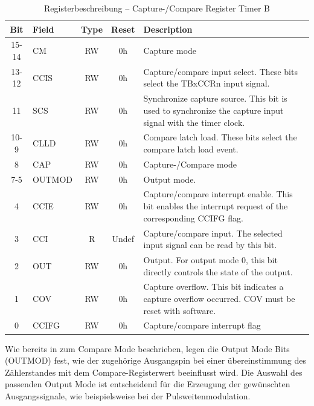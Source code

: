 \begin{table}[h!]
	\small
	\centering
	\begin{tabular}{|c|l|c|c|p{8cm}|}
		\hline
		\textbf{Bit} & \textbf{Field} & \textbf{Type} & \textbf{Reset} & \textbf{Description} \\ \hline
		15-14 & CM & RW & 0h & Capture mode \\ \hline
		13-12 & CCIS & RW & 0h & Capture/compare input select. These bits select the TBxCCRn input signal. \\ \hline
		11 & SCS & RW & 0h & Synchronize capture source. This bit is used to synchronize the capture input signal with the timer clock. \\ \hline
		10-9 & CLLD & RW & 0h & Compare latch load. These bits select the compare latch load event.  \\ \hline
		8 & CAP & RW & 0h & Capture-/Compare mode \\ \hline
		7-5 & OUTMOD & RW & 0h & Output mode. \\ \hline
		4 & CCIE & RW & 0h & Capture/compare interrupt enable. This bit enables the interrupt request of the corresponding CCIFG flag. \\ \hline
		3 & CCI & R & Undef & Capture/compare input. The selected input signal can be read by this bit. \\ \hline
		2 & OUT & RW & 0h & Output. For output mode 0, this bit directly controls the state of the output. \\ \hline
		1 & COV & RW & 0h & Capture overflow. This bit indicates a capture overflow occurred. COV must be reset with software.  \\ \hline
		0 & CCIFG & RW & 0h & Capture/compare interrupt flag \\ \hline
	\end{tabular}
	\caption{Registerbeschreibung – Capture-/Compare Register Timer B\\}
	\label{tab:tb_ccc_register}
\end{table}



Wie bereits in  zum Compare Mode beschrieben, legen die Output Mode Bits (OUTMOD) fest, wie der zugeh\"orige Ausgangspin bei einer \"ubereinstimmung des Z\"ahlerstandes mit dem Compare-Registerwert beeinflusst wird. Die Auswahl des passenden Output Mode ist entscheidend f\"ur die Erzeugung der gew\"unschten Ausgangssignale, wie beispielsweise bei der Pulsweitenmodulation.

